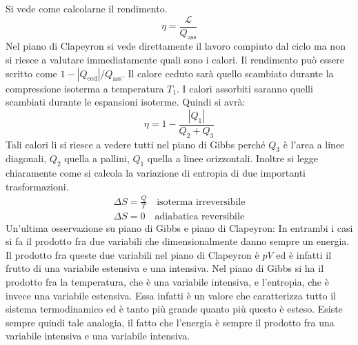 \documentclass[10pt,a4paper]{book}
\begin{document}
\begin{figure}[htpb]
\begin{tikzpicture}[x=0.75pt,y=0.75pt,yscale=-1,xscale=1]
	\end{tikzpicture}
\end{figure}
\FloatBarrier
Si vede come calcolarne il rendimento.
\[
	\eta = \frac{\mathcal{L} }{Q_{\text{ass} } }
\]
Nel piano di Clapeyron si vede direttamente il lavoro compiuto dal ciclo ma non si riesce a valutare immediatamente quali sono i calori. Il rendimento può essere scritto come $1-|Q_\text{ced}|/Q_\text{ass}$. Il calore ceduto sarà quello scambiato durante la compressione isoterma a temperatura $T_1$. I calori assorbiti saranno quelli scambiati durante le espansioni isoterme. Quindi si avrà:
\[
	\eta = 1 - \frac{|Q_1|}{Q_2+Q_3}
\]
Tali calori li si riesce a vedere tutti nel piano di Gibbs perché $Q_3$ è l'area a linee diagonali, $Q_2$ quella a pallini, $Q_1$ quella a linee orizzontali.
Inoltre si legge chiaramente come si calcola la variazione di entropia di due importanti trasformazioni.
\begin{gather*}
	\Delta S = \frac{Q}{T} \quad \text{isoterma irreversibile} \\
	\Delta S = 0 \quad \text{adiabatica reversibile}
\end{gather*}
Un'ultima osservazione su piano di Gibbs e piano di Clapeyron: In entrambi i casi si fa il prodotto fra due variabili che dimensionalmente danno sempre un energia. Il prodotto fra queste due variabili nel piano di Clapeyron è $pV$ ed è infatti il frutto di una variabile estensiva e una intensiva. Nel piano di Gibbs si ha il prodotto fra la temperatura, che è una variabile intensiva, e l'entropia, che è invece una variabile estensiva. Essa infatti è un valore che caratterizza tutto il sistema termodinamico ed è tanto più grande quanto più questo è esteso. Esiste sempre quindi tale analogia, il fatto che l'energia è sempre il prodotto fra una variabile intensiva e una variabile intensiva.
\end{document}
